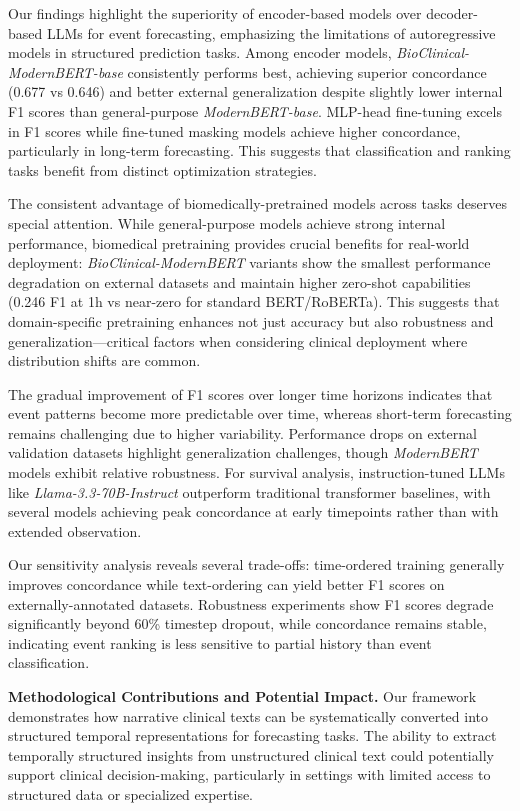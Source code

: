 Our findings highlight the superiority of encoder-based models over decoder-based LLMs for event forecasting, emphasizing the limitations of autoregressive models in structured prediction tasks. Among encoder models, \textit{BioClinical-ModernBERT-base} consistently performs best, achieving superior concordance (0.677 vs 0.646) and better external generalization despite slightly lower internal F1 scores than general-purpose \textit{ModernBERT-base}. MLP-head fine-tuning excels in F1 scores while fine-tuned masking models achieve higher concordance, particularly in long-term forecasting. This suggests that classification and ranking tasks benefit from distinct optimization strategies.

The consistent advantage of biomedically-pretrained models across tasks deserves special attention. While general-purpose models achieve strong internal performance, biomedical pretraining provides crucial benefits for real-world deployment: \textit{BioClinical-ModernBERT} variants show the smallest performance degradation on external datasets and maintain higher zero-shot capabilities (0.246 F1 at 1h vs near-zero for standard BERT/RoBERTa). This suggests that domain-specific pretraining enhances not just accuracy but also robustness and generalization—critical factors when considering clinical deployment where distribution shifts are common.

The gradual improvement of F1 scores over longer time horizons indicates that event patterns become more predictable over time, whereas short-term forecasting remains challenging due to higher variability. Performance drops on external validation datasets highlight generalization challenges, though \textit{ModernBERT} models exhibit relative robustness. For survival analysis, instruction-tuned LLMs like \textit{Llama-3.3-70B-Instruct} outperform traditional transformer baselines, with several models achieving peak concordance at early timepoints rather than with extended observation.

Our sensitivity analysis reveals several trade-offs: time-ordered training generally improves concordance while text-ordering can yield better F1 scores on externally-annotated datasets. Robustness experiments show F1 scores degrade significantly beyond 60\% timestep dropout, while concordance remains stable, indicating event ranking is less sensitive to partial history than event classification.

\textbf{Methodological Contributions and Potential Impact.} Our framework demonstrates how narrative clinical texts can be systematically converted into structured temporal representations for forecasting tasks. The ability to extract temporally structured insights from unstructured clinical text could potentially support clinical decision-making, particularly in settings with limited access to structured data or specialized expertise. 

